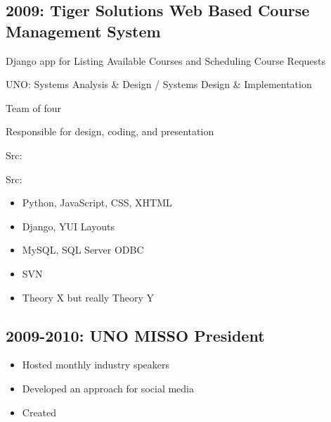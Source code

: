 \documentclass[letter,,openany,oneside,english]{sphinxhowto}
\begin{document}
\subsection{2009: Tiger Solutions Web Based Course Management System}
\label{\detokenize{resume:tiger-solutions-web-based-course-management-system}}
\begin{DUlineblock}{0em}
\item[] Django app for Listing Available Courses and Scheduling Course Requests
\item[] UNO: Systems Analysis \& Design / Systems Design \& Implementation
\item[] Team of four
\item[] Responsible for design, coding, and presentation
\item[] Src: 
\item[] Src: 
\end{DUlineblock}
\begin{itemize}
\item {} 
Python, JavaScript, CSS, XHTML

\item {} 
Django, YUI Layouts

\item {} 
MySQL, SQL Server ODBC

\item {} 
SVN

\item {} 
Theory X but really Theory Y

\end{itemize}


\subsection{2009-2010: UNO MISSO President}
\label{\detokenize{resume:uno-misso-president}}
\begin{DUlineblock}{0em}
\item[] 
\end{DUlineblock}
\begin{itemize}
\item {} 
Hosted monthly industry speakers

\item {} 
Developed an approach for social media

\item {} 
Created 

\end{itemize}
\end{document}
